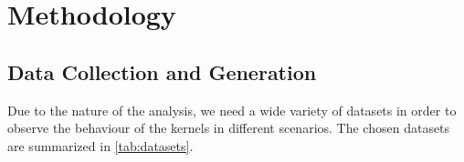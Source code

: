 





\section{Methodology}

\subsection{Data Collection and Generation}%

Due to the nature of the analysis, we need a wide variety of datasets in order to
observe the behaviour of the kernels in different scenarios. The chosen datasets
are summarized in \cref{tab:datasets}.

